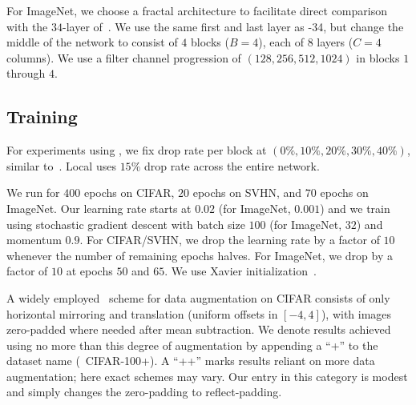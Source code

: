 For ImageNet, we choose a fractal architecture to facilitate direct comparison
with the $34$-layer {\resnet} of~\cite{he2015deep}.  We use the same first and
last layer as {\resnet}-34, but change the middle of the network to consist of
$4$ blocks ($B=4$), each of $8$ layers ($C=4$ columns).  We use a filter
channel progression of $(128, 256, 512, 1024)$ in blocks $1$ through $4$.

\subsection{Training}
\label{sec:training}

For experiments using {\dropout}, we fix drop rate per block at
$(0\%, 10\%, 20\%, 30\%, 40\%)$, similar to~\cite{elu}.  Local {\droppath}
uses $15\%$ drop rate across the entire network.

We run for $400$ epochs on CIFAR, $20$ epochs on SVHN, and $70$ epochs on
ImageNet.  Our learning rate starts at $0.02$ (for ImageNet, $0.001$) and we
train using stochastic gradient descent with batch size $100$ (for ImageNet,
$32$) and momentum $0.9$.  For CIFAR/SVHN, we drop the learning rate by a
factor of $10$ whenever the number of remaining epochs halves.  For ImageNet,
we drop by a factor of $10$ at epochs $50$ and $65$.  We use Xavier
initialization~\citep{glorot2010understanding}.

A widely employed~\citep{nin,elu,srivastava2015highway,he2015deep,
he2016identity,huang2016stochasticdepth,rir} scheme for data augmentation on
CIFAR consists of only horizontal mirroring and translation (uniform offsets
in $[-4,4]$), with images zero-padded where needed after mean subtraction.
We denote results achieved using no more than this degree of augmentation by
appending a ``+'' to the dataset name (\eg~CIFAR-100+).  A ``++'' marks
results reliant on more data augmentation; here exact schemes may vary.  Our
entry in this category is modest and simply changes the zero-padding to
reflect-padding.

